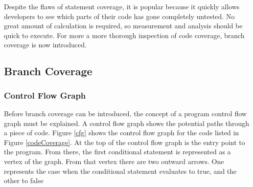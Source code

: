 Despite the flaws of statement coverage, it is popular because it quickly allows developers to see which parts of their code has gone completely untested. No great amount of calculation is required, so measurement and analysis should be quick to execute. For more a more thorough inspection of code coverage, branch coverage is now introduced.

\subsection{Branch Coverage}

\subsubsection{Control Flow Graph}

Before branch coverage can be introduced, the concept of a program control flow graph must be explained. A control flow graph shows the potential paths through a piece of code. Figure \ref{cfg} shows the control flow graph for the code listed in Figure \ref{codeCoverage}. At the top of the control flow graph is the entry point to the program. From there, the first conditional statement is represented as a vertex of the graph. From that vertex there are two outward arrows. One represents the case when the conditional statement evaluates to true, and the other to false \citep{Myers:2004:AST:983238}

